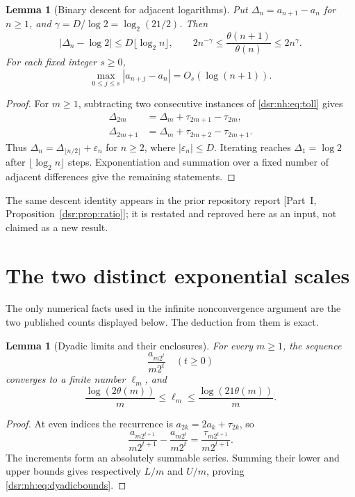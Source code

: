 \documentclass[11pt,a4paper]{article}
\numberwithin{equation}{section}
\newtheorem{lemma}[theorem]{Lemma}
\theoremstyle{definition}
\theoremstyle{remark}
\newcommand{\abs}[1]{\left|#1\right|}
\newcommand{\tht}{\theta}
\newcommand{\partref}[1]{\textup{[}Part~I, #1\textup{]}}
\theoremstyle{definition}
\theoremstyle{plain}
\begin{document}
\begin{lemma}[Binary descent for adjacent logarithms]
\label{dsr:nh:lem:ratios}
Put $\Delta_n=a_{n+1}-a_n$ for $n\ge1$, and
$\gamma=D/\log2=\log_2(21/2)$. Then
\begin{equation}
\abs{\Delta_n-\log2}\le D\lfloor\log_2 n\rfloor,
\qquad
2n^{-\gamma}\le\frac{\tht(n+1)}{\tht(n)}\le2n^{\gamma}.
\label{dsr:nh:eq:twosided}
\end{equation}
For each fixed integer $s\ge0$,
\begin{equation}
\max_{0\le j\le s}\abs{a_{n+j}-a_n}=O_s(\log(n+1)).
\label{dsr:nh:eq:shiftflat}
\end{equation}
\end{lemma}
\begin{proof}
For $m\ge1$, subtracting two consecutive instances of
\eqref{dsr:nh:eq:toll} gives
\begin{align}
\Delta_{2m}&=\Delta_m+\tau_{2m+1}-\tau_{2m},\\
\Delta_{2m+1}&=\Delta_m+\tau_{2m+2}-\tau_{2m+1}.
\end{align}
Thus $\Delta_n=\Delta_{\lfloor n/2\rfloor}+\varepsilon_n$ for $n\ge2$,
where $|\varepsilon_n|\le D$. Iterating reaches $\Delta_1=\log2$ after
$\lfloor\log_2 n\rfloor$ steps. Exponentiation and summation over a fixed
number of adjacent differences give the remaining statements.
\end{proof}
The same descent identity appears in the prior repository report
\partref{Proposition~\ref{dsr:prop:ratio}}; it is restated and reproved here as an input, not
claimed as a new result.

\section{The two distinct exponential scales}
\label{dsr:nh:sec:separation}
The only numerical facts used in the infinite nonconvergence argument are
the two published counts displayed below. The deduction from them is exact.

\begin{lemma}[Dyadic limits and their enclosures]
\label{dsr:nh:lem:dyadic}
For every $m\ge1$, the sequence
\[
\frac{a_{m2^t}}{m2^t}\quad(t\ge0)
\]
converges to a finite number $\ell_m$, and
\begin{equation}
\frac{\log(2\tht(m))}{m}\le\ell_m
\le\frac{\log(21\tht(m))}{m}.
\label{dsr:nh:eq:dyadicbounds}
\end{equation}
\end{lemma}
\begin{proof}
At even indices the recurrence is $a_{2k}=2a_k+\tau_{2k}$, so
\[
\frac{a_{m2^{t+1}}}{m2^{t+1}}
-\frac{a_{m2^t}}{m2^t}
=\frac{\tau_{m2^{t+1}}}{m2^{t+1}}.
\]
The increments form an absolutely summable series. Summing their lower and
upper bounds gives respectively $L/m$ and $U/m$, proving
\eqref{dsr:nh:eq:dyadicbounds}.
\end{proof}
\end{document}

